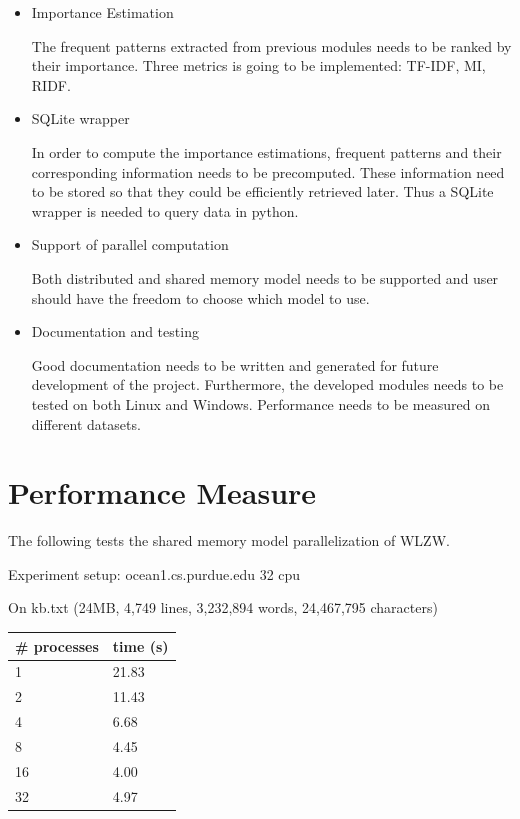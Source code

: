 \documentclass{article}
\begin{document}
\begin{itemize}
\item Importance Estimation

The frequent patterns extracted from previous modules needs to be ranked by their importance. Three metrics is going to be implemented: TF-IDF, MI, RIDF.

\item SQLite wrapper
 
In order to compute the importance estimations, frequent patterns and their corresponding information needs to be precomputed. These information need to be stored so that they could be efficiently retrieved later. Thus a SQLite wrapper is needed to query data in python.

\item Support of parallel computation

Both distributed and shared memory model needs to be supported and user should have the freedom to choose which model to use.

\item Documentation and testing

Good documentation needs to be written and generated for future development of the project. Furthermore, the developed modules needs to be tested on both Linux and Windows. Performance needs to be measured on different datasets.

\end{itemize}

\section{Performance Measure}

The following tests the shared memory model parallelization of WLZW.

Experiment setup:
ocean1.cs.purdue.edu 32 cpu 

On kb.txt (24MB, 4,749 lines, 3,232,894 words, 24,467,795 characters)

\begin{tabular}{|l|l|}
\hline
\# processes &time (s) \\
\hline
1&  21.83 \\
\hline
2&  11.43 \\
\hline
4&  6.68 \\
\hline
8&  4.45 \\
\hline
16&  4.00 \\
\hline
32&  4.97 \\
\hline
\end{tabular}
\end{document}
